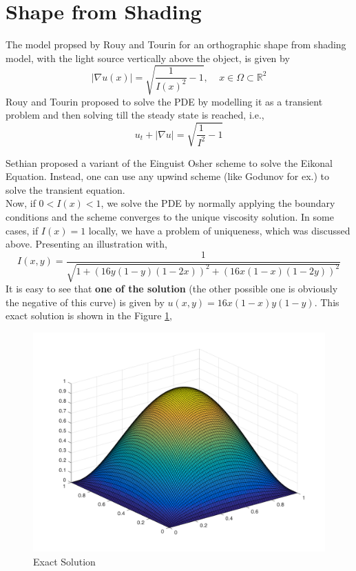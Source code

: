 \documentclass[11pt]{article}
\begin{document}
	
	\section{Shape from Shading}
	The model propsed by Rouy and Tourin\cite{rouy} for an orthographic shape from shading model, with the light source vertically above the object, is given by
	\begin{equation}
		|\nabla u(x)| = \sqrt{\frac{1}{I(x)^2} - 1}, \;\;\;\; x \in \Omega \subset \mathbb{R}^2
	\end{equation}
	Rouy and Tourin proposed to solve the PDE by modelling it as a transient problem and then solving till the steady state is reached, i.e.,
	\begin{equation}
		u_t + |\nabla u| = \sqrt{\frac{1}{I^2} - 1}
	\end{equation}
	
	\noindent
	Sethian\cite{sethian} proposed a variant of the Einguist Osher scheme to solve the Eikonal Equation. Instead, one can use any upwind scheme (like Godunov for ex.) to solve the transient equation.\\
	
	\noindent
	Now, if $0 < I(x) < 1$, we solve the PDE by normally applying the boundary conditions and the scheme converges to the unique viscosity solution. In some cases, if $ I(x) = 1$ locally, we have a problem of uniqueness, which was discussed above. Presenting an illustration with,
	\begin{equation}
		I(x,y) = \frac{1}{\sqrt{1+ (16y(1-y)(1-2x))^2 + (16x(1-x)(1-2y))^2}}
	\end{equation}
	It is easy to see that \textbf{one of the solution} (the other possible one is obviously the negative of this curve) is given by $u(x,y) = 16x(1-x)y(1-y)$. This exact solution is shown in the Figure \ref{fig:1},
	\begin{figure}[h!]
		\centering
		\includegraphics[scale = 0.3]{exact.png}
		\caption{Exact Solution}
		\label{fig:1}
	\end{figure}
	
\end{document}
